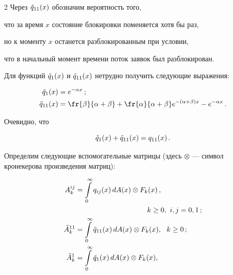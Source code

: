 \begin{multicols}{2}
Через $\Tilde q_{11}(x)$ обозначим вероятность того,


что за время $x$ состояние блокировки поменяется хотя бы раз,


но к моменту $x$ останется разблокированным при условии,


что в начальный момент времени поток заявок был разблокирован.


Для функций $\Tilde q_1(x)$ и $\Tilde q_{11}(x)$ нетрудно получить следующие выражения:


\begin{align*}


\Tilde q_1(x)&=e^{-\alpha x}\,;\\


\Tilde q_{11}(x)&=\fr{\beta}{\alpha + \beta} +\fr{\alpha}{ \alpha +\beta}e^{-(\alpha+\beta)x} - e^{-\alpha x}\,.


\end{align*}


Очевидно, что


$$


\Tilde q_1(x)+ \Tilde q_{11}(x)= q_{11}(x)\,.


$$





Определим следующие вспомогательные матрицы (здесь $\otimes$ --- символ кронекерова произведения матриц):





\noindent


\begin{align}


A^{ij}_{k} &=


\int\limits^\infty_0 q_{ij}(x)\,d A(x)


\otimes F_{k}(x)\,,\notag\\


&\ \ \ \ \ \ \ \ \ \ \ \ \ \hspace*{20mm}  k\ge0, \  i,j=0,1\,;\label{A_1}\\


\Tilde A^{11}_k &=


\int\limits^\infty_0 \Tilde q_{11}(x)\,d A(x)


\otimes F_{k}(x),


\ \ k\ge0\,;\notag\\


\Tilde A^1_k & =


\int\limits^\infty_0 \Tilde q_1(x)\,dA(x)


\otimes F_{k}(x),



\end{align}
\end{multicols}
